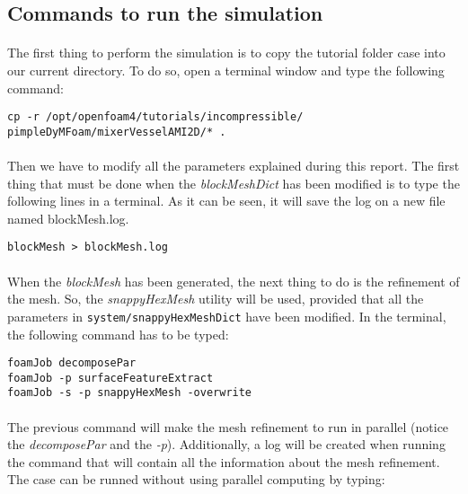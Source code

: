\subsection{Commands to run the simulation}
\paragraph{}The first thing to perform the simulation is to copy the tutorial folder case into our current directory. To do so, open a terminal window and type the following command:

\begin{center}
\texttt{cp -r /opt/openfoam4/tutorials/incompressible/\\ pimpleDyMFoam/mixerVesselAMI2D/* .
}
\end{center}
\paragraph{}Then we have to modify all the parameters explained during this report. The first thing that must be done when the \textit{blockMeshDict} has been modified is to type the following lines in a terminal. As it can be seen, it will save the log on a new file named blockMesh.log.

\begin{center}
\texttt{blockMesh > blockMesh.log}
\end{center}

\paragraph{}When the \textit{blockMesh} has been generated, the next thing to do is the refinement of the mesh. So, the \textit{snappyHexMesh} utility will be used, provided that all the parameters in \texttt{system/snappyHexMeshDict} have been modified. In the terminal, the following command has to be typed:

\begin{center}
\texttt{foamJob decomposePar \\
foamJob -p surfaceFeatureExtract \\
foamJob -s -p snappyHexMesh -overwrite}
\end{center}

\paragraph{}The previous command will make the mesh refinement to run in parallel (notice the \textit{decomposePar} and the \textit{-p}). Additionally, a log will be created when running the command that will contain all the information about the mesh refinement. The case can be runned without using parallel computing by typing:

